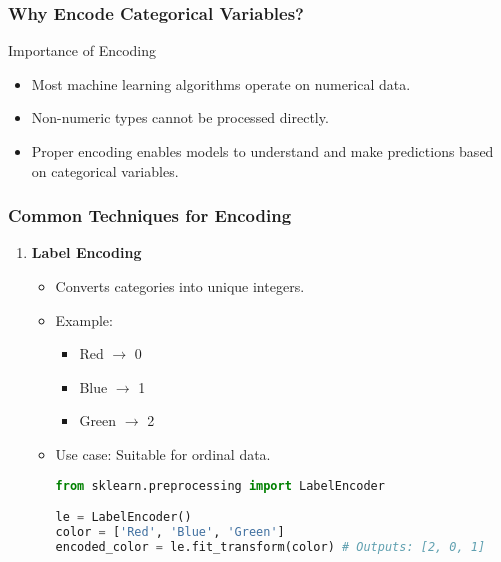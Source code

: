 \documentclass[aspectratio=169]{beamer}
\begin{document}
\begin{frame}[fragile]
    \frametitle{Why Encode Categorical Variables?}
    \begin{block}{Importance of Encoding}
        \begin{itemize}
            \item Most machine learning algorithms operate on numerical data.
            \item Non-numeric types cannot be processed directly.
            \item Proper encoding enables models to understand and make predictions based on categorical variables.
        \end{itemize}
    \end{block}
\end{frame}

\begin{frame}[fragile]
    \frametitle{Common Techniques for Encoding}
    \begin{enumerate}
        \item \textbf{Label Encoding}
            \begin{itemize}
                \item Converts categories into unique integers.
                \item Example: 
                \begin{itemize}
                    \item Red $\rightarrow$ 0
                    \item Blue $\rightarrow$ 1
                    \item Green $\rightarrow$ 2
                \end{itemize}
                \item Use case: Suitable for ordinal data.
                \begin{lstlisting}[language=Python]
from sklearn.preprocessing import LabelEncoder

le = LabelEncoder()
color = ['Red', 'Blue', 'Green']
encoded_color = le.fit_transform(color) # Outputs: [2, 0, 1]
\end{lstlisting}
            \end{itemize}
        

\end{enumerate}
\end{frame}
\end{document}
